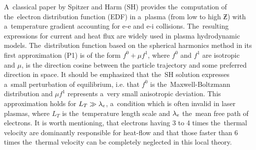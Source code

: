 A~classical paper by Spitzer and Harm (SH) 
\cite{SpitzerHarm_PR1953} provides the~computation of 
the~electron distribution function (EDF) in a~plasma (from low to high $\Zbar$)
with a~temperature gradient accounting for e-e and e-i collisions.
The~resulting expressions for current and heat flux are widely used in plasma 
hydrodynamic models.
The~distribution function based on the spherical harmonics method in 
its first approximation (P1) \cite{Jeans_MNRAS1917} is of the form 
$f^0+\mu f^1$, where $f^0$ and $f^1$ 
are isotropic and $\mu$, is the direction cosine between the particle 
trajectory and some preferred direction in space. It should be emphasized that
the~SH solution expresses a~small perturbation of equilibrium, i.e. that 
$f^0$ is the~Maxwell-Boltzmann distribution and $\mu f^1$ represents 
a~very small anisotropic deviation. 
This approximation holds for $L_T\gg\lambda_e$, 
a~condition which is often invalid in laser plasmas, 
where $L_T$ is the~temperature length scale and $\lambda_e$ 
the~mean free path of electrons. It is worth mentioning, that electrons having
3 to 4 times the~thermal velocity are dominantly responsible for heat-flow
and that those faster than 6 times the~thermal velocity can be completely 
neglected in this local theory.


